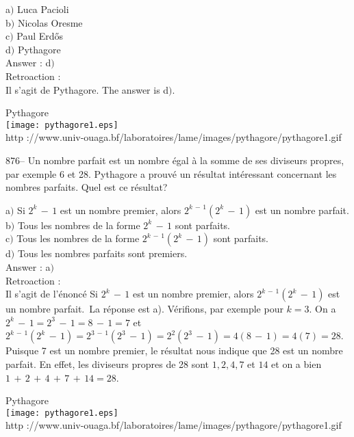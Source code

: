 ﻿\documentclass[letterpaper, 12pt]{article}
\begin{document}
a$)$ Luca Pacioli \\
b$)$ Nicolas Oresme \\
c$)$ Paul Erd\H{o}s \\
d$)$ Pythagore \\

Answer : d$)$\\

Retroaction : \\
Il s'agit de Pythagore. The answer is d$)$.\\

        \begin{center}
        Pythagore\\
    \texttt{[image: pythagore1.eps]}\\
        {\footnotesize http
://www.univ-ouaga.bf/laboratoires/lame/images/pythagore/pythagore1.gif}
    \end{center}

876-- Un nombre parfait est un nombre \'egal \`a la somme de ses
diviseurs propres, par exemple 6 et 28. Pythagore a prouv\'e un
r\'esultat int\'eressant concernant les nombres parfaits. Quel est
ce r\'esultat?

a$)$ Si $2^k\,-\,1$ est un nombre premier, alors $2^{k\,-\,1}(2^k\,-\,1)$
est un nombre parfait. \\
b$)$ Tous les nombres de la forme $2^k\,-\,1$ sont parfaits. \\
c$)$ Tous les nombres de la forme $2^{k\,-\,1}(2^k\,-\,1)$ sont parfaits. \\
d$)$ Tous les nombres parfaits sont premiers.\\

Answer : a$)$\\

Retroaction : \\
Il s'agit de l'\'enonc\'e \og Si $2^k\,-\,1$ est un nombre premier,
alors $2^{k\,-\,1}(2^k\,-\,1)$ est un nombre parfait.\fg\ La
r\'eponse est a). V\'erifions, par exemple pour $k=3$. On a
$2^k\,-\,1=2^3\,-\,1=8\,-\,1=7$ et
$2^{k\,-\,1}(2^k\,-\,1)=2^{3\,-\,1}(2^3\,-\,1)=2^2(2^3\,-\,1)=4(8\,-\,1)=4(7)=28$.
Puisque 7 est un nombre premier, le r\'esultat nous indique que 28
est un nombre parfait. En effet, les diviseurs propres de 28 sont
$1,2,4,7$ et $14$ et on a bien
$1\,+\,2\,+\,4\,+\,7\,+\,14=28$.\\

        \begin{center}
        Pythagore\\
    \texttt{[image: pythagore1.eps]}\\
        {\footnotesize http
://www.univ-ouaga.bf/laboratoires/lame/images/pythagore/pythagore1.gif}
    \end{center}
\end{document}
